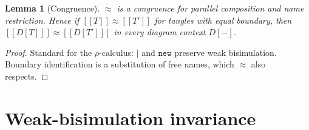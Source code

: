 \documentclass[11pt]{article}
\newtheorem{lemma}{Lemma}
\theoremstyle{definition}
\newcommand{\enc}[1]{[\![ #1 ]\!]}
\newcommand{\wbisim}{\approx}
\begin{document}
\begin{lemma}[Congruence]\label{lem:cong}
$\wbisim$ is a congruence for parallel composition and name restriction. Hence if
$\enc{T}\wbisim\enc{T'}$ for tangles with equal boundary, then
$\enc{D[T]}\wbisim\enc{D[T']}$ in every diagram context $D[-]$.
\end{lemma}
\begin{proof}
Standard for the $\rho$-calculus: $\mid$ and $\mathtt{new}$ preserve weak
bisimulation. Boundary identification is a substitution of free names, which
$\wbisim$ also respects.
\end{proof}

\section{Weak-bisimulation invariance}\label{sec:invariance}
\end{document}
